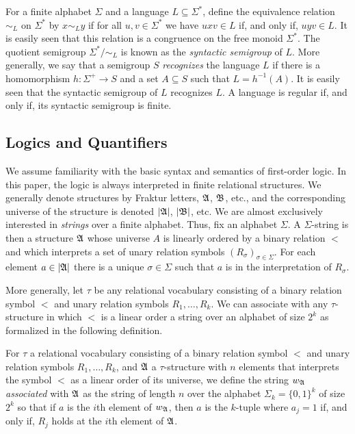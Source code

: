 \documentclass[a4paper,UKenglish,cleveref, autoref, thm-restate, anonymous]{lipics-v2021}
\begin{document}
For a finite alphabet $\Sigma$ and a language $L \subseteq \Sigma^*$, define the equivalence relation $\sim_L$ on $\Sigma^*$ by $x \sim_L y$ if for all $u,v \in \Sigma^*$ we have $uxv \in L$ if, and only if, $uyv \in L$.  It is easily seen that this relation is a congruence on the free monoid $\Sigma^*$.  The quotient semigroup $\Sigma^*/\sim_L$ is known as the \emph{syntactic semigroup} of $L$.  More generally, we say that a semigroup $S$ \emph{recognizes} the language $L$ if there is a homomorphism $h: \Sigma^+ \rightarrow S$ and a set $A \subseteq S$ such that $L = h^{-1}(A)$.  It is easily seen that the syntactic semigroup of $L$ recognizes $L$.  A language is regular if, and only if, its syntactic semigroup is finite.

\subsection{Logics and Quantifiers}\label{sec:backgroundmult}

We assume familiarity with the basic syntax and semantics of first-order logic.  In this paper, the logic is always interpreted in finite relational structures.  We generally denote structures by Fraktur letters, $\mathfrak{A}$, $\mathfrak{B}$, etc., and the corresponding universe of the structure is denoted $|\mathfrak{A}|$, $|\mathfrak{B}|$, etc.
We are almost exclusively interested in \emph{strings} over a finite alphabet.  Thus, fix an alphabet $\Sigma$.  A $\Sigma$-string is then a structure $\mathfrak{A}$ whose universe $A$ is linearly ordered by a binary relation $<$ and which interprets a set of unary relation symbols $(R_{\sigma})_{\sigma \in \Sigma}$.  For each element $a \in |\mathfrak{A}|$ there is a unique $\sigma \in \Sigma$ such that $a$ is in the interpretation of $R_{\sigma}$.

More generally, let $\tau$ be any relational vocabulary consisting of a binary relation symbol $<$ and unary relation symbols $R_1,\ldots,R_k$.  We can associate with any $\tau$-structure in which $<$ is a linear order a string over an alphabet of size $2^k$ as formalized in the following definition.
\begin{definition}\label{def:associated}
  For $\tau$ a relational vocabulary consisting of a binary relation symbol $<$ and unary relation symbols $R_1,\ldots,R_k$, and $\mathfrak{A}$ a $\tau$-structure with $n$ elements that interprets the symbol $<$ as a linear order of its universe, we define the string $w_{\mathfrak{A}}$ \emph{associated} with $\mathfrak{A}$ as the string of length $n$ over the alphabet $\Sigma_k = \{0,1\}^k$ of size $2^k$ so that if $a$ is the $i$th element  of $w_{\mathfrak{A}}$, then $a$ is the $k$-tuple where $a_j =1$ if, and only if, $R_j$ holds at the $i$th element of $\mathfrak{A}$.
\end{definition}
\end{document}
